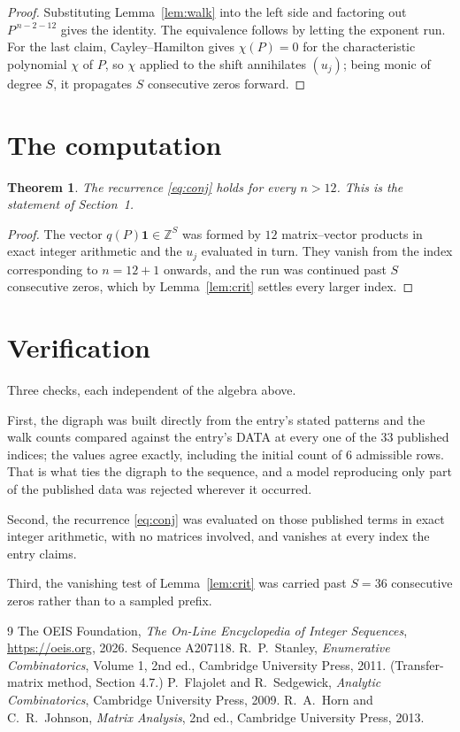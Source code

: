 \documentclass[11pt,a4paper]{article}
\theoremstyle{plain}
\newtheorem{theorem}{Theorem}
\theoremstyle{definition}
\begin{document}
\begin{proof}
Substituting Lemma~\ref{lem:walk} into the left side and factoring out
$P^{\,n-2-12}$ gives the identity. The equivalence follows by letting the exponent
run. For the last claim, Cayley--Hamilton gives $\chi(P)=0$ for the characteristic
polynomial $\chi$ of $P$, so $\chi$ applied to the shift annihilates $(u_j)$; being monic of
degree $S$, it propagates $S$ consecutive zeros forward.
\end{proof}

\section{The computation}

\begin{theorem}
The recurrence \eqref{eq:conj} holds for every $n>12$. This is the statement of
Section~1.
\end{theorem}

\begin{proof}
The vector $q(P)\mathbf{1}\in\mathbb{Z}^{S}$ was formed by $12$ matrix--vector
products in exact integer arithmetic and the $u_j$ evaluated in turn. They vanish from the
index corresponding to $n=12+1$ onwards, and the run was continued past $S$ consecutive
zeros, which by Lemma~\ref{lem:crit} settles every larger index.
\end{proof}

\section{Verification}

Three checks, each independent of the algebra above.

First, the digraph was built directly from the entry's stated patterns and the walk counts
compared against the entry's DATA at every one of the $33$ published indices; the
values agree exactly, including the initial count of $6$ admissible rows. That is
what ties the digraph to the sequence, and a model reproducing only part of the published
data was rejected wherever it occurred.

Second, the recurrence \eqref{eq:conj} was evaluated on those published terms in exact
integer arithmetic, with no matrices involved, and vanishes at every index the entry claims.

Third, the vanishing test of Lemma~\ref{lem:crit} was carried past $S=36$ consecutive
zeros rather than to a sampled prefix.

\begin{thebibliography}{9}
 The OEIS Foundation, \emph{The On-Line Encyclopedia of Integer
Sequences}, \url{https://oeis.org}, 2026. Sequence A207118.
 R.~P.~Stanley, \emph{Enumerative Combinatorics}, Volume 1, 2nd ed.,
Cambridge University Press, 2011. (Transfer-matrix method, Section 4.7.)
 P.~Flajolet and R.~Sedgewick, \emph{Analytic Combinatorics}, Cambridge
University Press, 2009.
 R.~A.~Horn and C.~R.~Johnson, \emph{Matrix Analysis}, 2nd ed., Cambridge
University Press, 2013.
\end{thebibliography}
\end{document}

